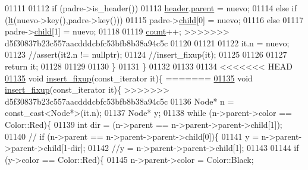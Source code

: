 \begin{DoxyCode}
01111         
01112         \textcolor{keywordflow}{if} (padre->is\_header())
01113             \hyperlink{classaed2_1_1map_a92d93f905c8ad73fba18fdc7e8915cce_a92d93f905c8ad73fba18fdc7e8915cce}{header}.\hyperlink{structaed2_1_1map_1_1Node_a91a1855da19d22344bc89c2f8b998a7a_a91a1855da19d22344bc89c2f8b998a7a}{parent} = nuevo;
01114         \textcolor{keywordflow}{else} if (\hyperlink{classaed2_1_1map_a0e5be36fae0693e4665bd2a615e7550a_a0e5be36fae0693e4665bd2a615e7550a}{lt}(nuevo->key(),padre->key()))
01115             padre->\hyperlink{structaed2_1_1map_1_1Node_acac3478cefbd8bebe0c3f3abb9a2935e_acac3478cefbd8bebe0c3f3abb9a2935e}{child}[0] = nuevo;
01116         \textcolor{keywordflow}{else}
01117             padre->\hyperlink{structaed2_1_1map_1_1Node_acac3478cefbd8bebe0c3f3abb9a2935e_acac3478cefbd8bebe0c3f3abb9a2935e}{child}[1] = nuevo;
01118         
01119         \hyperlink{classaed2_1_1map_a44236c4f16cdc20a10759862b198bde4_a44236c4f16cdc20a10759862b198bde4}{count}++;
>>>>>>> d5f30837b23c557aacdddcbfc53bfb8b38a94c5c
01120     
01121     
01122         it.n = nuevo;
01123         \textcolor{comment}{//assert(it2.n != nullptr);}
01124         \textcolor{comment}{//insert\_fixup(it);}
01125      
01126         
01127         \textcolor{keywordflow}{return} it;
01128 
01129     
01130     \}
01131  \}
01132 
01133 
01134     
<<<<<<< HEAD
\hypertarget{map3_8h_source_l01135}{}\hyperlink{classaed2_1_1map_ae4e5e735407f463bade9eeab6a553c53_ae4e5e735407f463bade9eeab6a553c53}{01135} \textcolor{keywordtype}{void} \hyperlink{classaed2_1_1map_ae4e5e735407f463bade9eeab6a553c53_ae4e5e735407f463bade9eeab6a553c53}{insert_fixup}(const\_iterator it)\{
=======
\hyperlink{classaed2_1_1map_ae4e5e735407f463bade9eeab6a553c53_ae4e5e735407f463bade9eeab6a553c53}{01135} \textcolor{keywordtype}{void} \hyperlink{classaed2_1_1map_ae4e5e735407f463bade9eeab6a553c53_ae4e5e735407f463bade9eeab6a553c53}{insert\_fixup}(const\_iterator it)\{
>>>>>>> d5f30837b23c557aacdddcbfc53bfb8b38a94c5c
01136     Node* n = \textcolor{keyword}{const\_cast<}Node*\textcolor{keyword}{>}(it.n);
01137     Node* y;
01138     \textcolor{keywordflow}{while} (n->parent->color == Color::Red)\{
01139         \textcolor{keywordtype}{int} dir = (n->parent == n->parent->parent->child[1]);
01140     \textcolor{comment}{//  if (n->parent == n->parent->parent->child[0])\{}
01141         y = n->parent->parent->child[1-dir];
01142         \textcolor{comment}{//y = n->parent->parent->child[1];}
01143         
01144         \textcolor{keywordflow}{if} (y->color == Color::Red)\{
01145             n->parent->color = Color::Black;

\end{DoxyCode}
